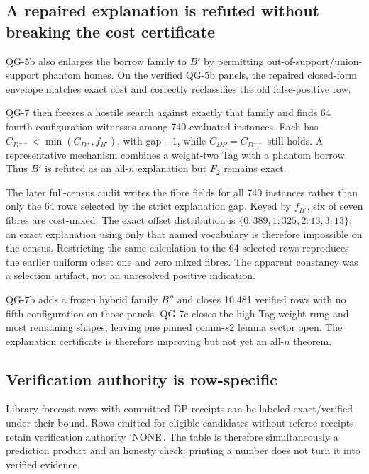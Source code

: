 \subsection{A repaired explanation is refuted without breaking the cost certificate}
QG-5b also enlarges the borrow family to $B'$ by permitting out-of-support/union-support phantom homes. On the verified QG-5b panels, the repaired closed-form envelope matches exact cost and correctly reclassifies the old false-positive row.

QG-7 then freezes a hostile search against exactly that family and finds 64 fourth-configuration witnesses among 740 evaluated instances. Each has $C_{D^{++}}<\min(C_{D^+},f_{B'})$, with gap $-1$, while $C_{DP}=C_{D^{++}}$ still holds. A representative mechanism combines a weight-two Tag with a phantom borrow. Thus $B'$ is refuted as an all-$n$ explanation but $F_2$ remains exact.

The later full-census audit writes the fibre fields for all 740 instances rather
than only the 64 rows selected by the strict explanation gap. Keyed by
$f_{B'}$, six of seven fibres are cost-mixed. The exact offset distribution is
$\{0:389,1:325,2:13,3:13\}$; an exact explanation using only that named
vocabulary is therefore impossible on the census. Restricting the same
calculation to the 64 selected rows reproduces the earlier uniform offset one
and zero mixed fibres. The apparent constancy was a selection artifact, not an
unresolved positive indication.

QG-7b adds a frozen hybrid family $B''$ and closes 10,481 verified rows with no fifth configuration on those panels. QG-7c closes the high-Tag-weight rung and most remaining shapes, leaving one pinned comm-$s2$ lemma sector open. The explanation certificate is therefore improving but not yet an all-$n$ theorem.

\subsection{Verification authority is row-specific}
Library forecast rows with committed DP receipts can be labeled exact/verified under their bound. Rows emitted for eligible candidates without referee receipts retain verification authority `NONE`. The table is therefore simultaneously a prediction product and an honesty check: printing a number does not turn it into verified evidence.
